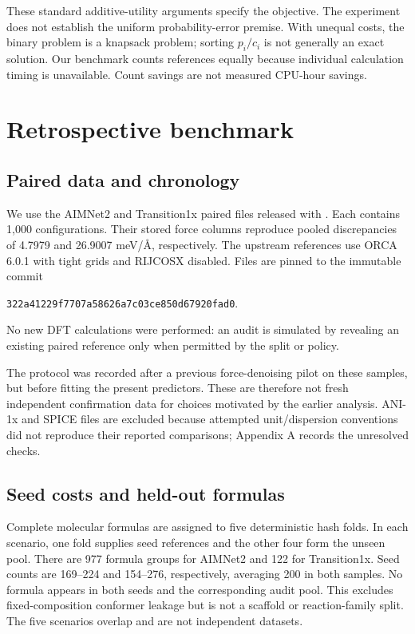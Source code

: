 \documentclass[11pt]{article}
\begin{document}
These standard additive-utility arguments specify the objective. The experiment
does not establish the uniform probability-error premise. With unequal costs,
the binary problem is a knapsack problem; sorting $p_i/c_i$ is not generally
an exact solution. Our benchmark counts references equally because individual
calculation timing is unavailable. Count savings are not measured CPU-hour savings.

\section{Retrospective benchmark}
\subsection{Paired data and chronology}
We use the AIMNet2 and Transition1x paired files released with
\citet{kuryla2025}. Each contains 1,000 configurations. Their stored force columns
reproduce pooled discrepancies of 4.7979 and 26.9007 meV/\AA, respectively.
The upstream references use ORCA 6.0.1 with tight grids and RIJCOSX disabled.
Files are pinned to the immutable commit
\begin{center}\small\texttt{322a41229f7707a58626a7c03ce850d67920fad0}.
\end{center}
No new DFT calculations were performed: an audit is simulated by revealing an
existing paired reference only when permitted by the split or policy.

The protocol was recorded after a previous force-denoising pilot on these samples,
but before fitting the present predictors. These are therefore not fresh independent
confirmation data for choices motivated by the earlier analysis. ANI-1x and SPICE
files are excluded because attempted unit/dispersion conventions did not reproduce
their reported comparisons; Appendix A records the unresolved checks.

\subsection{Seed costs and held-out formulas}
Complete molecular formulas are assigned to five deterministic hash folds. In each
scenario, one fold supplies seed references and the other four form the unseen
pool. There are 977 formula groups for AIMNet2 and 122 for Transition1x. Seed
counts are 169--224 and 154--276, respectively, averaging 200 in both samples.
No formula appears in both seeds and the corresponding audit pool. This excludes
fixed-composition conformer leakage but is not a scaffold or reaction-family split.
The five scenarios overlap and are not independent datasets.
\end{document}
